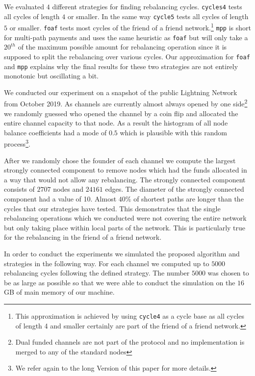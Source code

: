 \documentclass[conference]{IEEEtran}
\begin{document}
We evaluated $4$ different strategies for finding rebalancing cycles. \texttt{cycles4} tests all cycles of length $4$ or smaller. In the same way \texttt{cycle5} tests all cycles of length $5$ or smaller. \texttt{foaf} tests most cycles of the friend of a friend network.\footnote{This approximation is achieved by using \texttt{cycle4} as a cycle base as all cycles of length 4 and smaller certainly are part of the friend of a friend network.}
\texttt{mpp} is short for multi-path payments and uses the same heuristic as \texttt{foaf} but will only take a $20^{th}$ of the maximum possible amount for rebalancing operation since it is supposed to split the rebalancing over various cycles.
Our approximation for \texttt{foaf} and \texttt{mpp} explains why the final results for these two strategies are not entirely monotonic but oscillating a bit.

We conducted our experiment on a snapshot of the public Lightning Network from October 2019.
As channels are currently almost always opened by one side\footnote{Dual funded channels are not part of the protocol and no implementation is merged to any of the standard nodes} we randomly guessed who opened the channel by a coin flip and allocated the entire channel capacity to that node.
As a result the histogram of all node balance coefficients had a mode of $0.5$ which is plausible with this random process\footnote{We refer again to the long Version of this paper for more details.}.

After we randomly chose the founder of each channel we compute the largest strongly connected component to remove nodes which had the funds allocated in a way that would not allow any rebalancing.
The strongly connected component consists of $2707$ nodes and $24161$ edges.
The diameter of the strongly connected component had a value of 10.
Almost $40\%$ of shortest paths are longer than the cycles that our strategies have tested. 
This demonstrates that the single rebalancing operations which we conducted were not covering the entire network but only taking place within local parts of the network.
This is particularly true for the rebalancing in the friend of a friend network.

In order to conduct the experiments we simulated the proposed algorithm and strategies in the following way.
For each channel we computed up to $5000$ rebalancing cycles following the defined strategy.
The number $5000$ was chosen to be as large as possible so that we were able to conduct the simulation on the $16$ GB of main memory of our machine.
\end{document}
